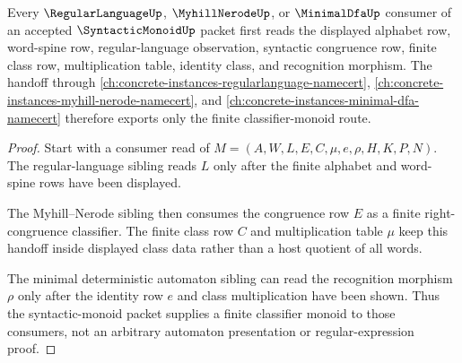 \begin{theorem}
\label{thm:syntactic-monoid-regularlanguage-handoff}
Every $\RegularLanguageUp$, $\MyhillNerodeUp$, or $\MinimalDfaUp$ consumer of an accepted $\SyntacticMonoidUp$ packet first reads the displayed alphabet row, word-spine row, regular-language observation, syntactic congruence row, finite class row, multiplication table, identity class, and recognition morphism. The handoff through \autoref{ch:concrete-instances-regularlanguage-namecert}, \autoref{ch:concrete-instances-myhill-nerode-namecert}, and \autoref{ch:concrete-instances-minimal-dfa-namecert} therefore exports only the finite classifier-monoid route.
\end{theorem}
\begin{proof}
Start with a consumer read of $M=(A,W,L,E,C,\mu,e,\rho,H,K,P,N)$. The regular-language sibling reads $L$ only after the finite alphabet and word-spine rows have been displayed.

The Myhill--Nerode sibling then consumes the congruence row $E$ as a finite right-congruence classifier. The finite class row $C$ and multiplication table $\mu$ keep this handoff inside displayed class data rather than a host quotient of all words.

The minimal deterministic automaton sibling can read the recognition morphism $\rho$ only after the identity row $e$ and class multiplication have been shown. Thus the syntactic-monoid packet supplies a finite classifier monoid to those consumers, not an arbitrary automaton presentation or regular-expression proof.
\end{proof}


\begin{closurestatus}{\SyntacticMonoidUp}
  \theoryclosure{\seedClosure}
  \formalstatus{\unformalizedV}
\end{closurestatus}
